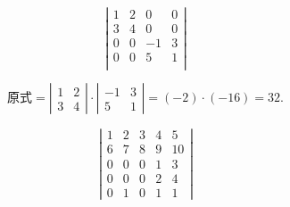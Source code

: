 \begin{li}
  $$
  \left|
    \begin{array}{rrrr}
      1&2&0&0\\
      3&4&0&0\\
      0&0&-1&3\\
      0&0&5&1\\
    \end{array}
  \right|
  $$
\end{li}

\begin{jie}

$$
\mbox{原式} = \left|
  \begin{array}{cc}
    1&2\\
    3&4      
  \end{array}
\right| \cdot
\left|
  \begin{array}{rr}
    -1&3\\
    5&1      
  \end{array}
\right| = (-2)\cdot(-16)=32.
$$
\end{jie}


\begin{li}
  $$
  \left|
    \begin{array}{rrrrr}
      1&2&3&4&5\\
      6&7&8&9&10\\
      0&0&0&1&3\\
      0&0&0&2&4\\
      0&1&0&1&1
    \end{array}
  \right|
  $$
\end{li}

